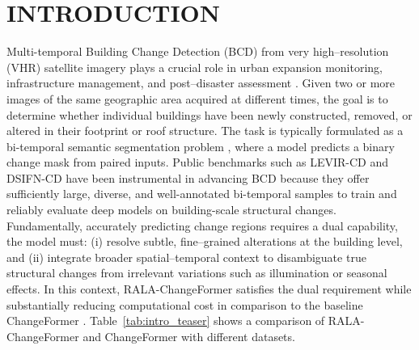 \section{\uppercase{Introduction}}
\label{sec:introduction}

Multi-temporal Building Change Detection (BCD) from very high–resolution (VHR) satellite imagery plays a crucial role in urban expansion monitoring, infrastructure management, and post–disaster assessment \cite{Daudt2018SiamICIP,Zhang2020FusionNet,Hussain2013Review}. Given two or more images of the same geographic area acquired at different times, the goal is to determine whether individual buildings have been newly constructed, removed, or altered in their footprint or roof structure. The task is typically formulated as a bi-temporal semantic segmentation problem \cite{Zhang2020Survey,Shafique2022Review}, where a model predicts a binary change mask from paired inputs. Public benchmarks such as LEVIR-CD \cite{Zheng2020LEVIR} and DSIFN-CD \cite{Shen2021DSIFN} have been instrumental in advancing BCD because they offer sufficiently large, diverse, and well-annotated bi-temporal samples to train and reliably evaluate deep models on building-scale structural changes. Fundamentally, accurately predicting change regions requires a dual capability, the model must: (i) resolve subtle, fine–grained alterations at the building level, and (ii) integrate broader spatial–temporal context to disambiguate true structural changes from irrelevant variations such as illumination or seasonal effects. In this context, RALA-ChangeFormer \cite{Fan2025RALA} satisfies the dual requirement while substantially reducing computational cost in comparison to the baseline ChangeFormer \cite{Bandara2022ChangeFormer}. Table~\ref{tab:intro_teaser} shows a comparison of RALA-ChangeFormer and ChangeFormer with different datasets.

\begin{table}[t]
\centering
\caption{Comparison between ChangeFormer (CF) and the proposed RALA-ChangeFormer (RALA-CF) on two benchmarks with input dimension 256 x 256 and batch 16.}
\label{tab:intro_teaser}
\end{table}

